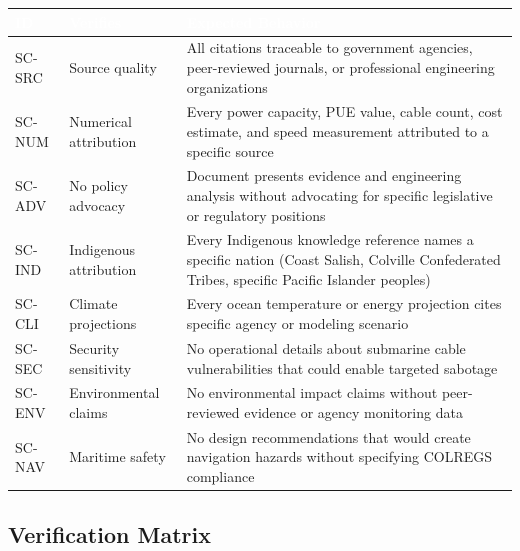 \documentclass[11pt,letterpaper]{article}
\newcommand{\tableheader}[1]{\textbf{\sffamily\textcolor{white}{#1}}}
\begin{document}
\begin{center}
\begin{tabularx}{\textwidth}{C{1.2cm}L{3cm}X}
\toprule
{}
\tableheader{ID} & \tableheader{Verifies} & \tableheader{Expected Behavior} \\
\midrule
SC-SRC & Source quality & All citations traceable to government agencies, peer-reviewed journals, or professional engineering organizations \\
SC-NUM & Numerical attribution & Every power capacity, PUE value, cable count, cost estimate, and speed measurement attributed to a specific source \\
SC-ADV & No policy advocacy & Document presents evidence and engineering analysis without advocating for specific legislative or regulatory positions \\
SC-IND & Indigenous attribution & Every Indigenous knowledge reference names a specific nation (Coast Salish, Colville Confederated Tribes, specific Pacific Islander peoples) \\
SC-CLI & Climate projections & Every ocean temperature or energy projection cites specific agency or modeling scenario \\
SC-SEC & Security sensitivity & No operational details about submarine cable vulnerabilities that could enable targeted sabotage \\
SC-ENV & Environmental claims & No environmental impact claims without peer-reviewed evidence or agency monitoring data \\
SC-NAV & Maritime safety & No design recommendations that would create navigation hazards without specifying COLREGS compliance \\
\bottomrule
\end{tabularx}
\end{center}

\subsection{Verification Matrix}
\end{document}
